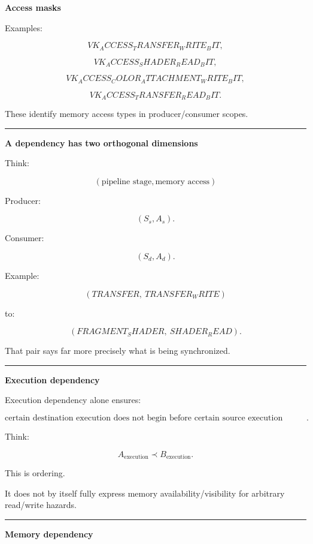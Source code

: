 \textbf{Access masks}

Examples:

\[
VK_ACCESS_TRANSFER_WRITE_BIT,
\]

\[
VK_ACCESS_SHADER_READ_BIT,
\]

\[
VK_ACCESS_COLOR_ATTACHMENT_WRITE_BIT,
\]

\[
VK_ACCESS_TRANSFER_READ_BIT.
\]

These identify memory access types in producer/consumer scopes.

\begin{center}\rule{0.5\linewidth}{0.5pt}\end{center}

\textbf{A dependency has two orthogonal dimensions}

Think:

\[
\boxed{
(\text{pipeline stage},\text{memory access})
}
\]

Producer:

\[
(S_s,A_s).
\]

Consumer:

\[
(S_d,A_d).
\]

Example:

\[
(TRANSFER,\ TRANSFER_WRITE)
\]

to:

\[
(FRAGMENT_SHADER,\ SHADER_READ).
\]

That pair says far more precisely what is being synchronized.

\begin{center}\rule{0.5\linewidth}{0.5pt}\end{center}

\textbf{Execution dependency}

Execution dependency alone ensures:

\[
\boxed{
\text{certain destination execution does not begin before certain source execution reaches the required point}.
}
\]

Think:

\[
A_{\text{execution}}
\prec
B_{\text{execution}}.
\]

This is ordering.

It does not by itself fully express memory availability/visibility for arbitrary read/write hazards.

\begin{center}\rule{0.5\linewidth}{0.5pt}\end{center}

\textbf{Memory dependency}

